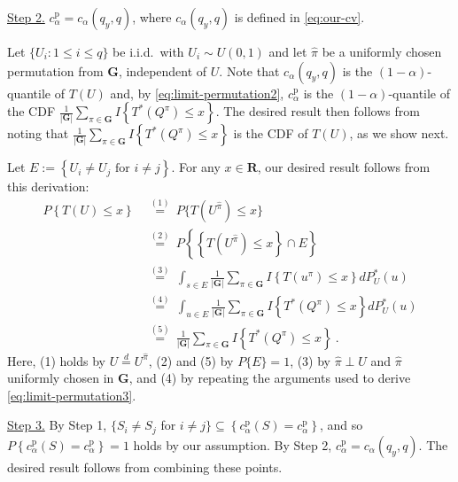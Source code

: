 \documentclass[11pt]{article}
\numberwithin{equation}{section}
\begin{document}
\noindent \underline{Step 2.} $c_{\alpha }^{\mathrm{p}}=c_{\alpha }\left( q_{y},q\right) $, where $c_{\alpha }\left( q_{y},q\right)$ is defined in \eqref{eq:our-cv}.

Let $\{U_i : 1\le i\le q\}$ be i.i.d.\ with $U_{i}\sim U\left( 0,1\right) $ and let $\hat{\pi}$ be a uniformly chosen permutation from $ \mathbf{G}$, independent of $U$. Note that $c_{\alpha }\left( q_{y},q\right) $ is the $\left( 1-\alpha \right) $-quantile of $T(U)$ and, by \eqref{eq:limit-permutation2}, $ c_{\alpha }^{\mathrm{p}}$ is the $\left( 1-\alpha \right) $-quantile of the CDF $\frac{1}{\left\vert \mathbf{G}\right\vert }\sum_{\pi \in \mathbf{G} }I\left\{ T^{\ast }(Q^{\pi })\leq x\right\} $. The desired result then follows from noting that $\frac{1}{\left\vert \mathbf{G}\right\vert }\sum_{\pi \in \mathbf{G}}I\left\{ T^{\ast }(Q^{\pi })\leq x\right\} $ is the CDF of $T(U)$, as we show next.

Let $E:=\left\{ U_{i}\not=U_{j}\text{ for }i\not=j\right\} $. For any $x\in \mathbf{R}$, our desired result follows from this derivation:
\begin{align*}
P\left\{ T(U)\leq x\right\} & ~\overset{(1)}{=}~P\{T(U^{\hat{\pi}})\leq x\} \\
& ~\overset{(2)}{=}~P\left\{ \left\{ T(U^{\hat{\pi}})\leq x\right\} \cap E\right\}  \\
& ~\overset{(3)}{=}~\int_{s\in E}\frac{1}{\left\vert \mathbf{G}\right\vert } \sum_{\pi \in \mathbf{G}}I\left\{ T(u^{\pi })\leq x\right\} dP_{U}^{\ast }(u) \\
& ~\overset{(4)}{=}~\int_{u\in E}\frac{1}{\left\vert \mathbf{G}\right\vert } \sum_{\pi \in \mathbf{G}}I\left\{ T^{\ast }(Q^{\pi })\leq x\right\} dP_{U}^{\ast }(u) \\
& ~\overset{(5)}{=}~\frac{1}{\left\vert \mathbf{G}\right\vert }\sum_{\pi \in \mathbf{G}}I\left\{ T^{\ast }(Q^{\pi })\leq x\right\} ~.
\end{align*}%
Here, (1) holds by $U\overset{d}{=}U^{\hat{\pi}}$, (2) and (5) by $P\{E\}=1$, (3) by $\hat{\pi}\perp U$ and $\hat{\pi}$ uniformly chosen in $\mathbf{G}$, and (4) by repeating the arguments used to derive \eqref{eq:limit-permutation3}.

\noindent \underline{Step 3.} By Step 1, $\{S_{i}\not=S_{j}$ for $ i\not=j\}\subseteq \left\{ c_{\alpha }^{\mathrm{p}}(S)=c_{\alpha }^{\mathrm{p}}\right\} $, and so $ P\left\{ c_{\alpha }^{\mathrm{p}}(S)=c_{\alpha }^{\mathrm{p}}\right\} =1$ holds by our assumption. By Step 2, $c_{\alpha }^{\mathrm{p}}=c_{\alpha }\left( q_{y},q\right) $. The desired result follows from combining these points.
\end{document}
